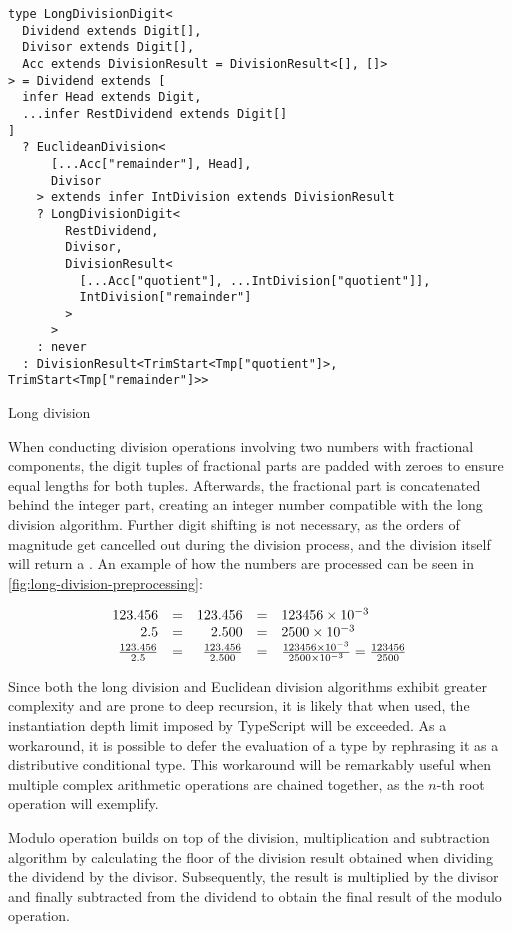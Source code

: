 \begin{listing}[ht]
  \begin{verbatim}
type LongDivisionDigit<
  Dividend extends Digit[],
  Divisor extends Digit[],
  Acc extends DivisionResult = DivisionResult<[], []>
> = Dividend extends [
  infer Head extends Digit,
  ...infer RestDividend extends Digit[]
]
  ? EuclideanDivision<
      [...Acc["remainder"], Head],
      Divisor
    > extends infer IntDivision extends DivisionResult
    ? LongDivisionDigit<
        RestDividend,
        Divisor,
        DivisionResult<
          [...Acc["quotient"], ...IntDivision["quotient"]],
          IntDivision["remainder"]
        >
      >
    : never
  : DivisionResult<TrimStart<Tmp["quotient"]>, TrimStart<Tmp["remainder"]>>
\end{verbatim}
  \caption{Long division}\label{lst:long-division}
\end{listing}

When conducting division operations involving two numbers with fractional components, the digit tuples of fractional parts are padded with zeroes to ensure equal lengths for both tuples. Afterwards, the fractional part is concatenated behind the integer part, creating an integer number compatible with the long division algorithm. Further digit shifting is not necessary, as the orders of magnitude get cancelled out during the division process, and the division itself will return a . An example of how the numbers are processed can be seen in \ref{fig:long-division-preprocessing}:

\begin{equation}\label{fig:long-division-preprocessing}
  \begin{array}{r@{\quad=\quad}r@{\quad=\quad}l}
    123.456             & 123.456               & 123456 \times 10^{-3}                                                   \\
    2.5                 & 2.500                 & 2500 \times 10^{-3}                                                     \\
    \frac{123.456}{2.5} & \frac{123.456}{2.500} & \frac{123456 \times 10^{-3}}{2500 \times 10^{-3}} = \frac{123456}{2500}
  \end{array}
\end{equation}

Since both the long division and Euclidean division algorithms exhibit greater complexity and are prone to deep recursion, it is likely that when used, the instantiation depth limit imposed by TypeScript will be exceeded. As a workaround, it is possible to defer the evaluation of a type by rephrasing it as a distributive conditional type. This workaround will be remarkably useful when multiple complex arithmetic operations are chained together, as the $n$-th root operation will exemplify.

Modulo operation builds on top of the division, multiplication and subtraction algorithm by calculating the floor of the division result obtained when dividing the dividend by the divisor. Subsequently, the result is multiplied by the divisor and finally subtracted from the dividend to obtain the final result of the modulo operation.